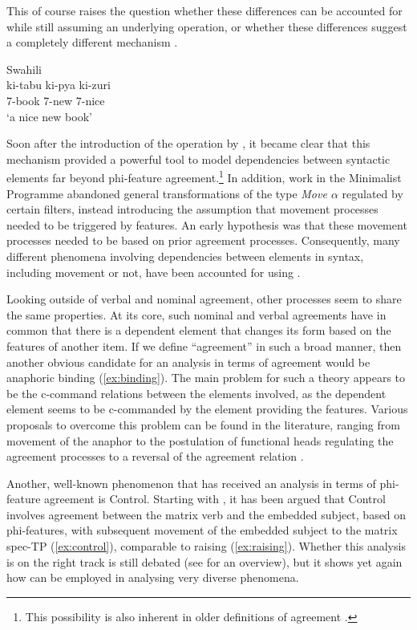 \documentclass[output=paper
,modfonts
,nonflat]{langsci/langscibook}
\begin{document}
This of course raises the question whether these differences can be accounted for while still assuming an underlying \agr{} operation, or whether these differences suggest a completely different mechanism \citep{Norris2014}.

\begin{exe}
	\ex Swahili \label{ex:swa-concorde}\\
	\gll ki-tabu ki-pya ki-zuri\\
	7-book 7-new 7-nice\\
	\glt `a nice new book'
\end{exe}
Soon after the introduction of the {\agr} operation by \citet{Chomsky2000,Chomsky2001}, it became clear that this mechanism provided a powerful tool to model dependencies between syntactic elements far beyond phi-feature agreement.\footnote{This possibility is also inherent in older definitions of agreement \citep{steel1978,kayne1989}.}
In addition, work in the Minimalist Programme abandoned general transformations of the type \textit{Move $\alpha$} regulated by certain filters, instead introducing the assumption that movement processes needed to be triggered by features.
An early hypothesis was that these  movement processes needed to be based on prior agreement processes.
Consequently, many different phenomena involving dependencies between elements in syntax, including movement or not, have been accounted for using \agr.

Looking outside of verbal and nominal agreement, other processes seem to share the same properties.
At its core, such nominal and verbal agreements have in common that there is a dependent element that changes its form based on the features of another item.
If we define ``agreement'' in such a broad manner, then another obvious candidate for an analysis in terms of agreement would be anaphoric binding (\ref{ex:binding}). The main problem for such a theory appears to be the c-command relations between the elements involved, as the dependent element seems to be c-commanded by the element providing the features. Various proposals to overcome this problem can be found in the literature, ranging from movement of the anaphor \citep{rooryckvandenwyngaerd} to the postulation of functional heads regulating the agreement processes \citep{reuland2001,reuland2011} to a reversal of the agreement relation \citep{bjorkmanzeijlstra}.

Another, well-known phenomenon that has received an analysis in terms of phi-feature agreement is Control. Starting with \citet{hornstein1999}, it has been argued that Control involves agreement between the matrix verb and the embedded subject, based on phi-fea\-tures, with subsequent movement of the embedded subject to the matrix spec-TP (\ref{ex:control}), comparable to raising (\ref{ex:raising}). Whether this analysis is on the right track is still debated (see \citealt{landau2013} for an overview), but it shows yet again how {\agr} can be employed in analysing very diverse phenomena.
\end{document}
